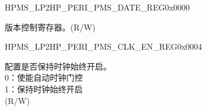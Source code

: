 \begin{register}{H}{PMS\_LP2HP\_PERI\_PMS\_DATE\_REG}{0x0000}\label{regdesc:PMSLP2HPPERIPMSDATEREG}
%
\regnewline%
\begin{regdesc}\begin{reglist}
\label{fielddesc:PMSLP2HPPERIPMSDATE}\item [PMS\_LP2HP\_PERI\_PMS\_DATE] 版本控制寄存器。(R/W)
\end{reglist}\end{regdesc}
\end{register}


\begin{register}{H}{PMS\_LP2HP\_PERI\_PMS\_CLK\_EN\_REG}{0x0004}\label{regdesc:PMSLP2HPPERIPMSCLKENREG}
%
%
\regnewline%
\begin{regdesc}\begin{reglist}
\label{fielddesc:PMSLP2HPPERIPMSCLKEN}\item [PMS\_LP2HP\_PERI\_PMS\_CLK\_EN] 配置是否保持时钟始终开启。\\
0：使能自动时钟门控 \\
1：保持时钟始终开启 \\
(R/W)
\end{reglist}\end{regdesc}
\end{register}


